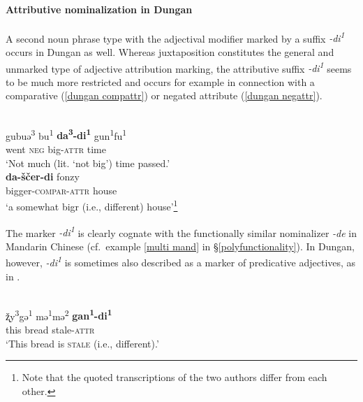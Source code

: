 \paragraph*{Attributive nominalization in Dungan}
A second noun phrase type with the adjectival modifier marked by a suffix \textit{-di\textsuperscript{1}} occurs in Dungan as well. Whereas juxtaposition constitutes the general and unmarked type of adjective attribution marking, the attributive suffix \textit{-di\textsuperscript{1}} seems to be much more restricted and occurs for example in connection with a comparative (\ref{dungan compattr}) or negated attribute (\ref{dungan negattr}).
\begin{exe}
\begin{xlist}
\\
\label{dungan negattr}
\gll	gubuə\textsuperscript{3} bu\textsuperscript{1} \textbf{da\textsuperscript{3}-di\textsuperscript{1}} gun\textsuperscript{1}fu\textsuperscript{1}\\
	went \textsc{neg} big-\textsc{attr} time\\
\glt	‘Not much (lit. ‘not big’) time passed.’
\\
\label{dungan compattr}
\gll	\textbf{da-ščer-di} fonzy\\
	bigger-\textsc{compar}-\textsc{attr} house\\
\glt	‘a somewhat bigr (i.e., different) house’\footnote{Note that the quoted transcriptions of the two authors differ from each other.}
\end{xlist}
\end{exe}	
The marker \textit{-di\textsuperscript{1}} is clearly cognate with the functionally similar nominalizer \textit{-de} in Mandarin Chinese (cf.~example \ref{multi mand} in \S\ref{polyfunctionality}). In Dungan, however, \textit{-di\textsuperscript{1}} is sometimes also described as a marker of predicative adjectives, as in .
\begin{exe}
\\
\label{dungan emphpred}
\gll	ž̨y\textsuperscript{3}gə\textsuperscript{1} mə\textsuperscript{1}mə\textsuperscript{2} \textbf{gan\textsuperscript{1}-di\textsuperscript{1}}\\
	this bread stale-\textsc{attr}\\
\glt	‘This bread is \textsc{stale} (i.e., different).’
\end{exe}
